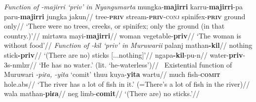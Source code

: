 \pex\textit{Function of \textit{-majirri} `\gls{priv}' in Nyangumarta}
\a\begingl\gla mungka-\textbf{majirri} karru-\textbf{majirri}-pa paru-\textbf{majirri} jungka jakun//
\glb tree\textsc{-\textbf{priv}} stream\textsc{-\textbf{priv}-conj} spinifex\textsc{-\textbf{priv}} ground only//
\glft`There were no trees, creeks, or spinifex; only the ground (in that country.)'//\endgl
\a\begingl\gla mirtawa mayi-\textbf{majirri}//
\glb woman vegetable-\textbf{\gls{priv}}//
\glft`The woman is without food'//\endgl\xe
\pex \textit{Function of \textit{-kil} `\gls{priv}' in Muruwarii}
\a\begingl\gla palanj mathan\textbf{-kil}//
\glb nothing stick\textbf{-\gls{priv}}//
\glft`(There are no) sticks [...nothing]'//\endgl
{}
\a\begingl\gla ngapa\textbf{-kil}-pu-n//
\glb water-\textbf{\gls{priv}}-3\gls{s}-\gls{nmlzr}//
\glft`He has no water.' (lit. `he-waterless')// \endgl
 \xe
\pex~Existential function of Muruwari \textit{-piɾa, -yita} `\gls{comit}' 
\a\begingl%
	\gla \rightcomment{[Muruwari]}thuu kuya-\textbf{yita} wartu//
	\glb much fish-\textsc{\textbf{comit}} hole.\gls{abs}//
	\glft`The river has a lot of fish in it.' (=There's a lot of fish in the river)//\endgl
	\a\begingl\gla\rightcomment{[Muruwari]}wala mathan-\textbf{piɾa}//
	\glb \gls{neg} limb-\textbf{\gls{comit}}//
	\glft`(There are) no sticks.'//\endgl
\xe




